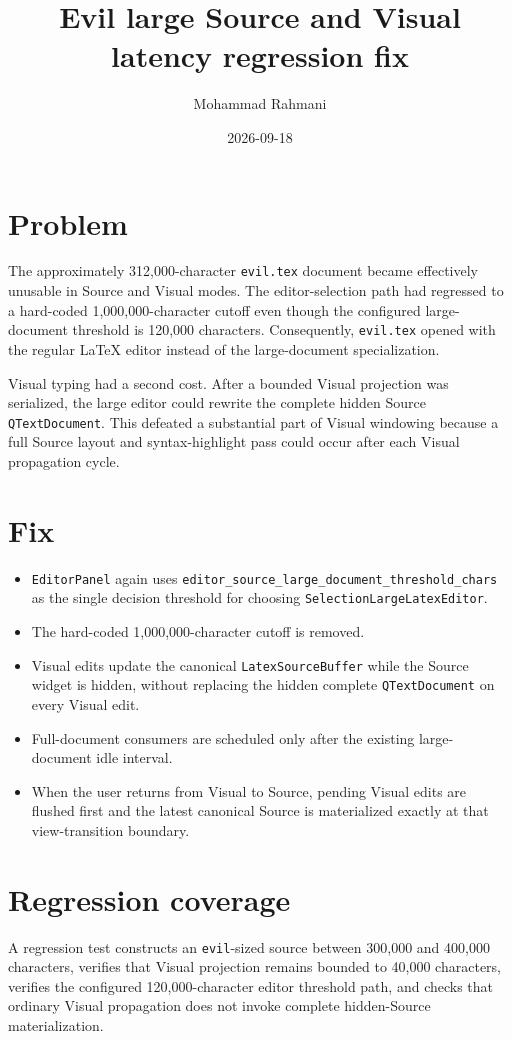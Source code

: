 \documentclass[a4paper]{article}
\title{Evil large Source and Visual latency regression fix}
\date{2026-09-18}
\author{Mohammad Rahmani}
\begin{document}
   \maketitle

   \section{Problem}
   The approximately 312,000-character \texttt{evil.tex} document became
   effectively unusable in Source and Visual modes.  The editor-selection path
   had regressed to a hard-coded 1,000,000-character cutoff even though the
   configured large-document threshold is 120,000 characters.  Consequently,
   \texttt{evil.tex} opened with the regular LaTeX editor instead of the
   large-document specialization.

   Visual typing had a second cost.  After a bounded Visual projection was
   serialized, the large editor could rewrite the complete hidden Source
   \texttt{QTextDocument}.  This defeated a substantial part of Visual
   windowing because a full Source layout and syntax-highlight pass could occur
   after each Visual propagation cycle.

   \section{Fix}
   \begin{itemize}
      \item \texttt{EditorPanel} again uses
      \texttt{editor\_source\_large\_document\_threshold\_chars} as the single
      decision threshold for choosing \texttt{SelectionLargeLatexEditor}.
      \item The hard-coded 1,000,000-character cutoff is removed.
      \item Visual edits update the canonical \texttt{LatexSourceBuffer} while
      the Source widget is hidden, without replacing the hidden complete
      \texttt{QTextDocument} on every Visual edit.
      \item Full-document consumers are scheduled only after the existing
      large-document idle interval.
      \item When the user returns from Visual to Source, pending Visual edits
      are flushed first and the latest canonical Source is materialized exactly
      at that view-transition boundary.
   \end{itemize}

   \section{Regression coverage}
   A regression test constructs an \texttt{evil}-sized source between 300,000
   and 400,000 characters, verifies that Visual projection remains bounded to
   40,000 characters, verifies the configured 120,000-character editor
   threshold path, and checks that ordinary Visual propagation does not invoke
   complete hidden-Source materialization.

   
   
\end{document}
